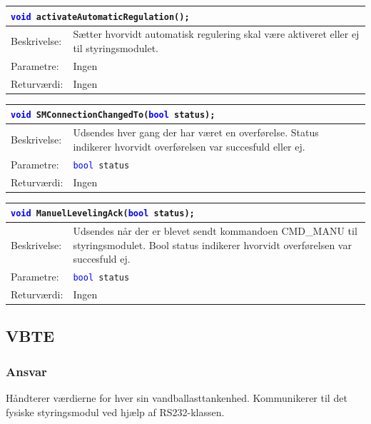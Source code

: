 \begin{table}[H]
\begin{tabular}{l p{12.5cm}}
\multicolumn{2}{l}{\texttt{\textcolor{blue}{void} activateAutomaticRegulation();}} \\
\hline
Beskrivelse: &Sætter hvorvidt automatisk regulering skal være aktiveret eller ej til styringsmodulet.\\
Parametre:&Ingen\\
Returværdi:&Ingen\\
\end{tabular}
\end{table}

\begin{table}[H]
\begin{tabular}{l p{12.5cm}}
\multicolumn{2}{l}{\texttt{\textcolor{blue}{void} SMConnectionChangedTo(\textcolor{blue}{bool} status);}} \\
\hline
Beskrivelse: &Udsendes hver gang der har været en overførelse. Status indikerer hvorvidt overførelsen var succesfuld eller ej.\\
Parametre:&\texttt{\textcolor{blue}{bool} status}\\
Returværdi:&Ingen\\
\end{tabular}
\end{table}

\begin{table}[H]
\begin{tabular}{l p{12.5cm}}
\multicolumn{2}{l}{\texttt{\textcolor{blue}{void} ManuelLevelingAck(\textcolor{blue}{bool} status);}} \\
\hline
Beskrivelse: &Udsendes når der er blevet sendt kommandoen CMD\_MANU til styringsmodulet. Bool status indikerer hvorvidt overførelsen var succesfuld ej.\\
Parametre:&\texttt{\textcolor{blue}{bool} status}\\
Returværdi:&Ingen\\
\end{tabular}
\end{table}

\subsection{VBTE}
\subsubsection{Ansvar}
Håndterer værdierne for hver sin vandballasttankenhed. Kommunikerer til det fysiske styringsmodul ved hjælp af RS232-klassen.
